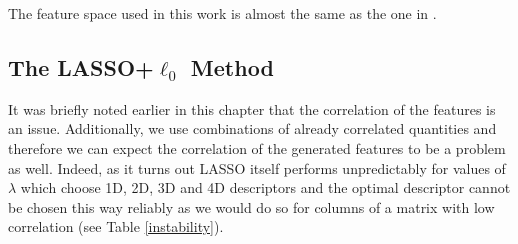 \documentclass[11pt,oneside,czech,american]{book} %
\theoremstyle{plain}
\theoremstyle{definition}
\begin{document}
The feature space used in this work is almost the same as the one in \parencite{ghiringhelli17}.

\subsection{The LASSO+$\ell_{0}$ Method}
It was briefly noted earlier in this chapter that the correlation of the features is an issue. Additionally, we use combinations of already correlated quantities and therefore we can expect the correlation of the generated features to be a problem as well. Indeed, as it turns out LASSO itself performs unpredictably for values of $\lambda$ which choose 1D, 2D, 3D and 4D descriptors and the optimal descriptor cannot be chosen this way reliably as we would do so for columns of a matrix with low correlation (see Table \ref{instability}).
\end{document}
